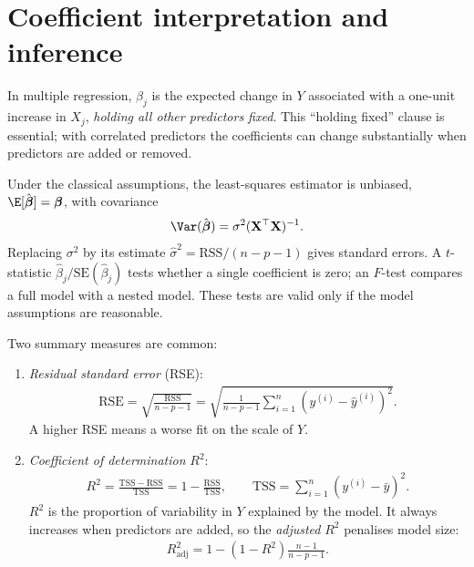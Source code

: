 \documentclass[a4paper, 12pt]{book}
\begin{document}
\section{Coefficient interpretation and inference}

In multiple regression, $\beta_j$ is the expected change in $Y$ associated with a
one-unit increase in $X_j$, \emph{holding all other predictors fixed}. This
``holding fixed'' clause is essential; with correlated predictors the coefficients can
change substantially when predictors are added or removed.

Under the classical assumptions, the least-squares estimator is unbiased,
$\E[\hat{\boldsymbol{\beta}}]=\boldsymbol{\beta}$, with covariance
\begin{align}
    \Var(\hat{\boldsymbol{\beta}})
    = \sigma^2(\mathbf{X}^\top\mathbf{X})^{-1}.
\end{align}
Replacing $\sigma^2$ by its estimate
$\hat{\sigma}^2 = \mathrm{RSS}/(n-p-1)$ gives standard errors. A $t$-statistic
$\hat{\beta}_j/\mathrm{SE}(\hat{\beta}_j)$ tests whether a single coefficient is
zero; an $F$-test compares a full model with a nested model. These tests are valid
only if the model assumptions are reasonable.

Two summary measures are common:
\begin{enumerate}
    \item \emph{Residual standard error} (RSE):
    \begin{align}
        \mathrm{RSE}
        = \sqrt{\frac{\mathrm{RSS}}{n-p-1}}
        = \sqrt{\frac{1}{n-p-1}\sum_{i=1}^n (y^{(i)} - \hat{y}^{(i)})^2}.
    \end{align}
    A higher RSE means a worse fit on the scale of $Y$.
    \item \emph{Coefficient of determination} $R^2$:
    \begin{align}
        R^2 = \frac{\mathrm{TSS} - \mathrm{RSS}}{\mathrm{TSS}}
        = 1 - \frac{\mathrm{RSS}}{\mathrm{TSS}},
        \qquad
        \mathrm{TSS} = \sum_{i=1}^n (y^{(i)} - \bar{y})^2.
    \end{align}
    $R^2$ is the proportion of variability in $Y$ explained by the model. It always
    increases when predictors are added, so the \emph{adjusted} $R^2$ penalises model
    size:
    \begin{align}
        R^2_{\mathrm{adj}}
        = 1 - (1-R^2)\frac{n-1}{n-p-1}.
    \end{align}
\end{enumerate}
\end{document}
